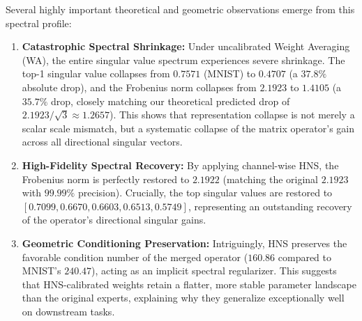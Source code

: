 \documentclass{article}
\theoremstyle{plain}
\theoremstyle{definition}
\theoremstyle{remark}
\begin{document}
Several highly important theoretical and geometric observations emerge from this spectral profile:
\begin{enumerate}
  \item \textbf{Catastrophic Spectral Shrinkage:} Under uncalibrated Weight Averaging (WA), the entire singular value spectrum experiences severe shrinkage. The top-1 singular value collapses from $0.7571$ (MNIST) to $0.4707$ (a $37.8\%$ absolute drop), and the Frobenius norm collapses from $2.1923$ to $1.4105$ (a $35.7\%$ drop, closely matching our theoretical predicted drop of $2.1923 / \sqrt{3} \approx 1.2657$). This shows that representation collapse is not merely a scalar scale mismatch, but a systematic collapse of the matrix operator's gain across all directional singular vectors.
  \item \textbf{High-Fidelity Spectral Recovery:} By applying channel-wise HNS, the Frobenius norm is perfectly restored to $2.1922$ (matching the original $2.1923$ with $99.99\%$ precision). Crucially, the top singular values are restored to $[0.7099, 0.6670, 0.6603, 0.6513, 0.5749]$, representing an outstanding recovery of the operator's directional singular gains.
  \item \textbf{Geometric Conditioning Preservation:} Intriguingly, HNS preserves the favorable condition number of the merged operator ($160.86$ compared to MNIST's $240.47$), acting as an implicit spectral regularizer. This suggests that HNS-calibrated weights retain a flatter, more stable parameter landscape than the original experts, explaining why they generalize exceptionally well on downstream tasks.
\end{enumerate}
\end{document}
